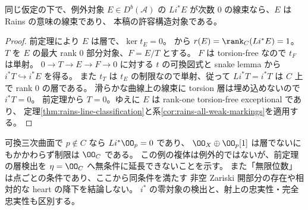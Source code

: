\begin{corollary}[制限が線束である例外対象]\label{cor:restricted-exceptional-line}
同じ仮定の下で、例外対象 $E\in D^b(\mathcal A)$ の
$Li^*E$ が次数 $0$ の線束なら、$E$ は Rains の意味の線束であり、
本稿の許容構造対象である。
\end{corollary}
\begin{proof}
前定理により $E$ は層で、$\ker t_E=0$。
\cite[Lemma 7.2]{RainsBir}から $r(E)=\rank_C(Li^*E)=1$。
$T$ を $E$ の最大 rank $0$ 部分対象、$F=E/T$ とする。
$F$ は torsion-free なので $t_F$ は単射。
$0\to T\to E\to F\to0$ に対する $t$ の可換図式と snake lemma から
$i^*T\hookrightarrow i^*E$ を得る。
また $t_T$ は $t_E$ の制限なので単射、従って $Li^*T=i^*T$ は
$C$ 上で rank $0$ の層である。
滑らかな曲線上の線束に torsion 層は埋め込めないので $i^*T=0$。
前定理から $T=0$。ゆえに $E$ は rank-one torsion-free exceptional であり、
定理\ref{thm:rains-line-classification}と系\ref{cor:rains-all-weak-markings}を適用する。
\end{proof}

\begin{remark}\label{rem:restriction-scope}
可換三次曲面で $p\notin C$ なら $Li^*\OO_p=0$ であり、
$\OO_X\oplus\OO_p[1]$ は層でないにもかかわらず制限は $\OO_C$ である。
この例の複体は例外的ではないが、前定理の層検出を
$\eta=\OO_C$ へ無条件に延長できないことを示す。
また「無限位数」は点ごとの条件であり、ここから同条件を満たす
非空 Zariski 開部分の存在や相対的な heart の降下を結論しない。
$i^*$ の零対象の検出と、射上の忠実性・完全忠実性も区別する。
\end{remark}

